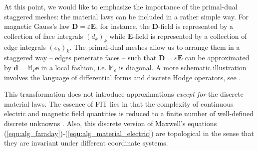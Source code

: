 \documentclass{article}
\begin{document}
At this point, we would like to emphasize the importance of the primal-dual staggered meshes: the material laws can be included in a rather simple way. For magnetic Gauss's law $\mathbf{D} = \varepsilon \mathbf{E}$, for instance, the $\mathbf{D}$-field is represented by a collection of face integrals $ (d_k)_{k}$ while $\mathbf{E}$-field is represented by a collection of edge integrals $ (e_k)_{k}$. The primal-dual meshes allow us to arrange them in a staggered way -- edges penetrate faces -- such that $\mathbf{D} = \varepsilon \mathbf{E}$ can be approximated by $\mathbf{d} = \mathbb{M}_{\varepsilon}\mathbf{e}$ in a local fashion, i.e. $\mathbb{M}_{\varepsilon}$ is diagonal. A more schematic illustration involves the language of differential forms and discrete Hodge operators, see \cite{bossavit1999, teixeira_1999, hip_1999}. 

This transformation does not introduce approximations \emph{except for} the discrete material laws. The essence of FIT lies in that the complexity of continuous electric and magnetic field quantities
is reduced to a finite number of well-defined discrete unknowns \citep{weiland_2003}. Also, this discrete version of Maxwell's equations (\ref{equ:alg_faraday})-(\ref{equ:alg_material_electric}) are topological in the sense that they are invariant under different coordinate systems.
\end{document}
